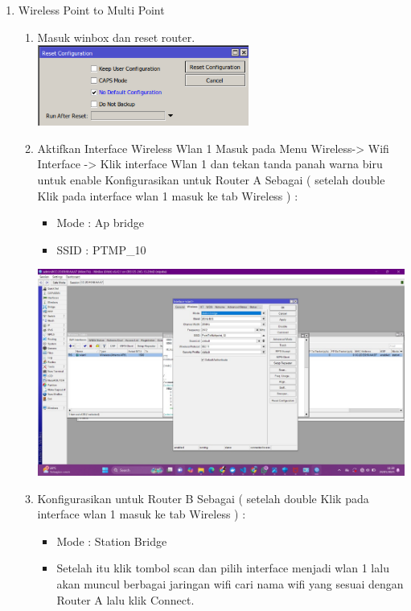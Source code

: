 \begin{enumerate}
\begin{enumerate}
    \end{enumerate}
    \item Wireless Point to Multi Point
    \begin{enumerate}
        \item Masuk winbox dan reset router. \newline
        \includegraphics[scale=2]{P1/img/1.png}
        \item Aktifkan Interface Wireless Wlan 1 Masuk pada Menu Wireless-> Wifi Interface -> Klik interface Wlan 1 dan tekan tanda panah warna biru untuk enable Konfigurasikan untuk Router A Sebagai ( setelah double Klik pada interface wlan 1 masuk ke tab Wireless ) :
        \begin{itemize}
            \item Mode : Ap bridge
            \item SSID : PTMP\_10
        \end{itemize}
        \includegraphics[scale=0.4]{P1/img/6.jpg} \newline
        \item Konfigurasikan untuk Router B Sebagai ( setelah double Klik pada interface wlan 1 masuk ke tab Wireless ) :
        \begin{itemize}
            \item Mode : Station Bridge
            \item Setelah itu klik tombol scan dan pilih interface menjadi wlan 1 lalu akan muncul berbagai jaringan wifi cari nama wifi yang sesuai dengan Router A lalu klik Connect.

\end{itemize}
\end{enumerate}
\end{enumerate}

